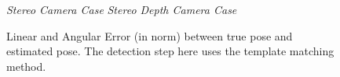 \begin{figure}
	\hspace*{20px}\textit{Stereo Camera Case} \hspace{75px} \textit{Stereo Depth Camera Case}\\
	\vspace{30px}
	\caption[Tracking error plots with template matching detection initialization]{Linear and Angular Error (in norm) between true pose and estimated pose. The detection step here uses the template matching method.}
	\label{fig:templateErrors}
\end{figure}